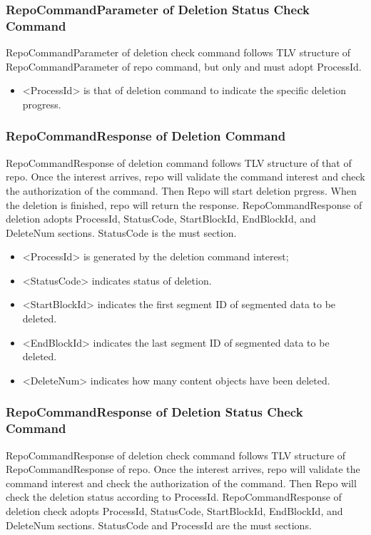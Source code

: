 \documentclass{acm_proc_article-sp}
\begin{document}
\subsubsection{RepoCommandParameter of Deletion Status Check Command}
RepoCommandParameter of deletion check command follows TLV structure of RepoCommandParameter of repo command, but only and must adopt ProcessId.

\begin{itemize}
\item <ProcessId> is that of deletion command to indicate the specific deletion progress.
\end{itemize}


\subsubsection{RepoCommandResponse of Deletion Command}
RepoCommandResponse of deletion command follows TLV structure of that of repo. Once the interest arrives, repo will validate the command interest and check the authorization of the command. Then Repo will start deletion prgress. When the deletion is finished, repo will return the response. RepoCommandResponse of deletion adopts ProcessId, StatusCode, StartBlockId, EndBlockId, and DeleteNum sections. StatusCode is the must section.

\begin{itemize}
\item <ProcessId> is generated by the deletion command interest;
\item <StatusCode> indicates status of deletion.
\item <StartBlockId> indicates the first segment ID of segmented data to be deleted.
\item <EndBlockId> indicates the last segment ID of segmented data to be deleted.
\item <DeleteNum> indicates how many content objects have been deleted.
\end{itemize}

\subsubsection{RepoCommandResponse of Deletion Status Check Command}
RepoCommandResponse of deletion check command follows TLV structure of RepoCommandResponse of repo. Once the interest arrives, repo will validate the command interest and check the authorization of the command. Then Repo will check the deletion status according to ProcessId. RepoCommandResponse of deletion check adopts ProcessId, StatusCode, StartBlockId, EndBlockId, and DeleteNum sections. StatusCode and ProcessId are the must sections.
\end{document}
